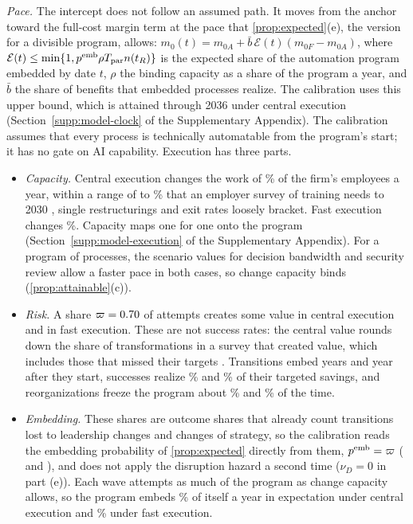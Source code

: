 \emph{Pace.} The intercept does not follow an assumed path. It moves from the anchor toward the full-cost margin term at the pace that \autoref{prop:expected}(e), the version for a divisible program, allows: $m_0(t)=m_{0A}+\bar b\,\mathcal E(t)(m_{0F}-m_{0A})$, where $\mathcal E(t)\le\min\{1,p^{\rm emb}\rho T_{\mathrm{par}}n(t_R)\}$ is the expected share of the automation program embedded by date $t$, $\rho$ the binding capacity as a share of the program a year, and $\bar b$ the share of benefits that embedded processes realize. The calibration uses this upper bound, which is attained through 2036 under central execution (Section~\ref{supp:model-clock} of the Supplementary Appendix). The calibration assumes that every process is technically automatable from the program's start; it has no gate on AI capability. Execution has three parts.
\begin{itemize}
\item \emph{Capacity.} Central execution changes the work of \PaceCapCen\% of the firm's employees a year, within a range of \PaceCapSlow{} to \PaceCapFast\% that an employer survey of training needs to 2030 \citep{wef2025futurejobs}, single restructurings and exit rates loosely bracket. Fast execution changes \PaceCapFast\%. Capacity maps one for one onto the program (Section~\ref{supp:model-execution} of the Supplementary Appendix). For a program of \PaceNproc{} processes, the scenario values for decision bandwidth and security review allow a faster pace in both cases, so change capacity binds (\autoref{prop:attainable}(c)).
\item \emph{Risk.} A share $\varpi=0.70$ of attempts creates some value in central execution and \PaceSuccFast{} in fast execution. These are not success rates: the central value rounds down the share of transformations in a survey that created value, which includes those that missed their targets \citep{bcg2020flipping}. Transitions embed \PaceEmbCen{} years and \PaceEmbFast{} year after they start, successes realize \PaceRealCen\% and \PaceRealFast\% of their targeted savings, and reorganizations freeze the program about \PaceFrzCen\% and \PaceFrzFast\% of the time.
\item \emph{Embedding.} These shares are outcome shares that already count transitions lost to leadership changes and changes of strategy, so the calibration reads the embedding probability of \autoref{prop:expected} directly from them, $p^{\rm emb}=\varpi$ (\PaceQCen{} and \PaceQFast), and does not apply the disruption hazard a second time ($\nu_D=0$ in part (e)). Each wave attempts as much of the program as change capacity allows, so the program embeds \PaceRateCen\% of itself a year in expectation under central execution and \PaceRateFast\% under fast execution.
\end{itemize}
